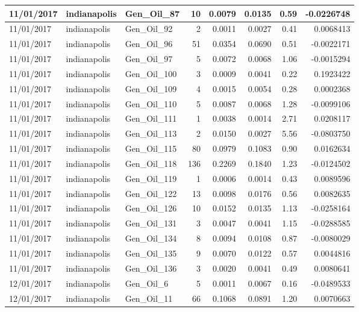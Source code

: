 \documentclass[
  letterpaper,
  DIV=11,
  numbers=noendperiod]{scrartcl}
\begin{document}
\begin{tabular}{l|l|l|r|r|r|r|r}
\hline
11/01/2017 & indianapolis & Gen\_Oil\_87 & 10 & 0.0079 & 0.0135 & 0.59 & -0.0226748\\
\hline
11/01/2017 & indianapolis & Gen\_Oil\_92 & 2 & 0.0011 & 0.0027 & 0.41 & 0.0068413\\
\hline
11/01/2017 & indianapolis & Gen\_Oil\_96 & 51 & 0.0354 & 0.0690 & 0.51 & -0.0022171\\
\hline
11/01/2017 & indianapolis & Gen\_Oil\_97 & 5 & 0.0072 & 0.0068 & 1.06 & -0.0015294\\
\hline
11/01/2017 & indianapolis & Gen\_Oil\_100 & 3 & 0.0009 & 0.0041 & 0.22 & 0.1923422\\
\hline
11/01/2017 & indianapolis & Gen\_Oil\_109 & 4 & 0.0015 & 0.0054 & 0.28 & 0.0002368\\
\hline
11/01/2017 & indianapolis & Gen\_Oil\_110 & 5 & 0.0087 & 0.0068 & 1.28 & -0.0099106\\
\hline
11/01/2017 & indianapolis & Gen\_Oil\_111 & 1 & 0.0038 & 0.0014 & 2.71 & 0.0208117\\
\hline
11/01/2017 & indianapolis & Gen\_Oil\_113 & 2 & 0.0150 & 0.0027 & 5.56 & -0.0803750\\
\hline
11/01/2017 & indianapolis & Gen\_Oil\_115 & 80 & 0.0979 & 0.1083 & 0.90 & 0.0162634\\
\hline
11/01/2017 & indianapolis & Gen\_Oil\_118 & 136 & 0.2269 & 0.1840 & 1.23 & -0.0124502\\
\hline
11/01/2017 & indianapolis & Gen\_Oil\_119 & 1 & 0.0006 & 0.0014 & 0.43 & 0.0089596\\
\hline
11/01/2017 & indianapolis & Gen\_Oil\_122 & 13 & 0.0098 & 0.0176 & 0.56 & 0.0082635\\
\hline
11/01/2017 & indianapolis & Gen\_Oil\_126 & 10 & 0.0152 & 0.0135 & 1.13 & -0.0258164\\
\hline
11/01/2017 & indianapolis & Gen\_Oil\_131 & 3 & 0.0047 & 0.0041 & 1.15 & -0.0288585\\
\hline
11/01/2017 & indianapolis & Gen\_Oil\_134 & 8 & 0.0094 & 0.0108 & 0.87 & -0.0080029\\
\hline
11/01/2017 & indianapolis & Gen\_Oil\_135 & 9 & 0.0070 & 0.0122 & 0.57 & 0.0044816\\
\hline
11/01/2017 & indianapolis & Gen\_Oil\_136 & 3 & 0.0020 & 0.0041 & 0.49 & 0.0080641\\
\hline
12/01/2017 & indianapolis & Gen\_Oil\_6 & 5 & 0.0011 & 0.0067 & 0.16 & -0.0489533\\
\hline
12/01/2017 & indianapolis & Gen\_Oil\_11 & 66 & 0.1068 & 0.0891 & 1.20 & 0.0070663\\

\end{tabular}
\end{document}

